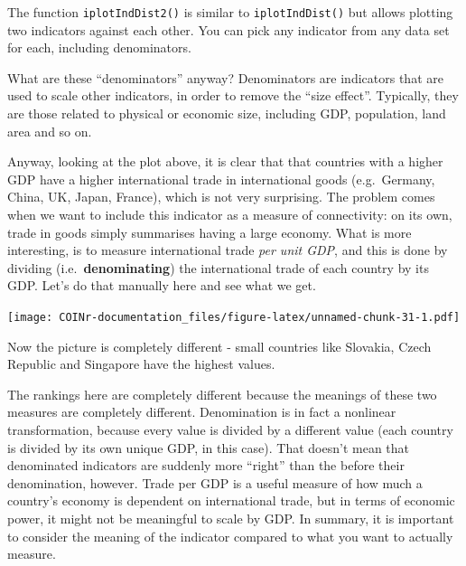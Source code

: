 \documentclass[
]{book}
\newenvironment{Shaded}{\begin{snugshade}}{\end{snugshade}}
\newcommand{\CommentTok}[1]{\textcolor[rgb]{0.56,0.35,0.01}{\textit{#1}}}
\newcommand{\DataTypeTok}[1]{\textcolor[rgb]{0.13,0.29,0.53}{#1}}
\newcommand{\KeywordTok}[1]{\textcolor[rgb]{0.13,0.29,0.53}{\textbf{#1}}}
\newcommand{\NormalTok}[1]{#1}
\newcommand{\OperatorTok}[1]{\textcolor[rgb]{0.81,0.36,0.00}{\textbf{#1}}}
\newcommand{\StringTok}[1]{\textcolor[rgb]{0.31,0.60,0.02}{#1}}
\begin{document}
The function \texttt{iplotIndDist2()} is similar to \texttt{iplotIndDist()} but allows plotting two indicators against each other. You can pick any indicator from any data set for each, including denominators.

What are these ``denominators'' anyway? Denominators are indicators that are used to scale other indicators, in order to remove the ``size effect''. Typically, they are those related to physical or economic size, including GDP, population, land area and so on.

Anyway, looking at the plot above, it is clear that that countries with a higher GDP have a higher international trade in international goods (e.g.~Germany, China, UK, Japan, France), which is not very surprising. The problem comes when we want to include this indicator as a measure of connectivity: on its own, trade in goods simply summarises having a large economy. What is more interesting, is to measure international trade \emph{per unit GDP}, and this is done by dividing (i.e.~\textbf{denominating}) the international trade of each country by its GDP. Let's do that manually here and see what we get.

\begin{Shaded}
\end{Shaded}

\texttt{[image: COINr-documentation\_files/figure-latex/unnamed-chunk-31-1.pdf]}

Now the picture is completely different - small countries like Slovakia, Czech Republic and Singapore have the highest values.

The rankings here are completely different because the meanings of these two measures are completely different. Denomination is in fact a nonlinear transformation, because every value is divided by a different value (each country is divided by its own unique GDP, in this case). That doesn't mean that denominated indicators are suddenly more ``right'' than the before their denomination, however. Trade per GDP is a useful measure of how much a country's economy is dependent on international trade, but in terms of economic power, it might not be meaningful to scale by GDP. In summary, it is important to consider the meaning of the indicator compared to what you want to actually measure.
\end{document}

